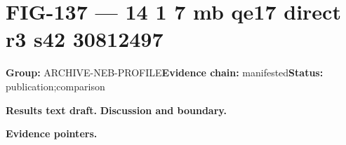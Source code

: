 \clearpage
\section{FIG-137 --- 14 1 7 mb qe17 direct r3 s42 30812497}
\label{figpage:fig-137}
\textbf{Group:} ARCHIVE-NEB-PROFILE\quad \textbf{Evidence chain:} manifested\quad \textbf{Status:} publication;comparison

\textbf{Results text draft.} 
\textbf{Discussion and boundary.} 


\textbf{Evidence pointers.}



\vfill
